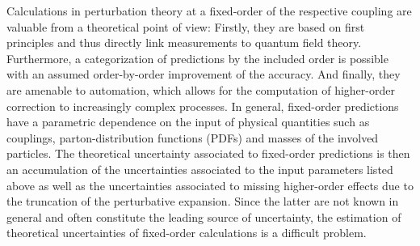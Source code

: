 Calculations in perturbation theory at a fixed-order of the
respective coupling are valuable from a theoretical point of view: Firstly, they are based on first
principles and thus directly link measurements to quantum field theory. Furthermore, a categorization of predictions by the
included order is possible with an
assumed order-by-order improvement of the accuracy. And finally, they are
amenable to automation, which allows for the computation of higher-order
correction to increasingly complex processes. In
general, fixed-order predictions have a parametric dependence on the input of physical
quantities such as couplings, parton-distribution
functions (PDFs) and masses of the involved particles. The theoretical
uncertainty associated to fixed-order predictions is then an accumulation of the
uncertainties associated to the input parameters listed above as well
as the uncertainties associated to missing higher-order effects due to the truncation of the perturbative expansion. Since
the latter are not known in general and often constitute the leading
source of uncertainty, the estimation of theoretical uncertainties of
fixed-order calculations is
a difficult problem. 


